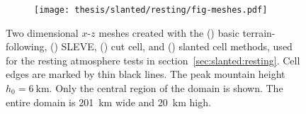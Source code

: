 \begin{figure}
	\centering
	\begin{subfigure}{\textwidth}
		\label{fig:slanted:resting:meshes:btf}
		\label{fig:slanted:resting:meshes:sleve}
		\label{fig:slanted:resting:meshes:cutCell}
		\label{fig:slanted:resting:meshes:slantedCell}
		\texttt{[image: thesis/slanted/resting/fig-meshes.pdf]}
	\end{subfigure}
%
	\caption{Two dimensional $x$-$z$ meshes created with the
	() basic terrain-following,
	() SLEVE,
	() cut cell, and
	() slanted cell methods, used for the resting atmosphere tests in section~\ref{sec:slanted:resting}.  Cell edges are marked by thin black lines.  The peak mountain height $h_0 = \SI{6}{\kilo\meter}$.
	Only the central region of the domain is shown.  The entire domain is \SI{201}{\kilo\meter} wide and \SI{20}{\kilo\meter} high.}
	\label{fig:slanted:resting:meshes}
\end{figure}

